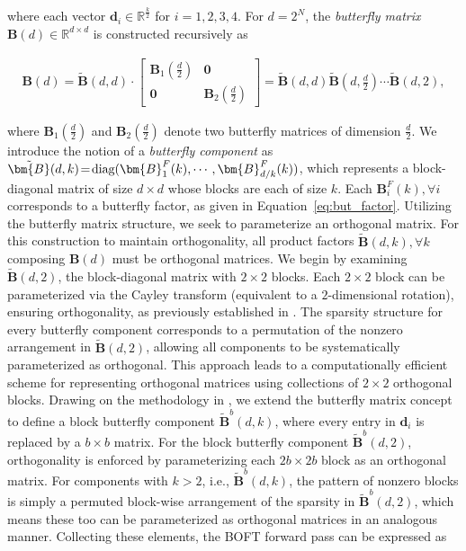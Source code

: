 where each vector $\bm{d}_i \in \mathbb{R}^{\frac{k}{2}}$ for $i=1,2,3,4$. For $d=2^N$, the \emph{butterfly matrix} $\bm{B}(d)\in\mathbb{R}^{d\times d}$ is constructed recursively as

\begin{equation}
\begin{aligned}
    \!\!\bm{B}(d)=\tilde{\bm{B}}(d,d)\!\cdot\!\begin{bmatrix}
    \bm{B}_1(\frac{d}{2})\!\!\!\!\! & \bm{0} \\
    \bm{0}\!\!\!\!\! &\bm{B}_2(\frac{d}{2})
    \end{bmatrix}= \tilde{\bm{B}}(d,d)\tilde{\bm{B}}(d,\frac{d}{2})\cdots\tilde{\bm{B}}(d,2),
\end{aligned}
\end{equation}

where $\bm{B}_1(\frac{d}{2})$ and $\bm{B}_2(\frac{d}{2})$ denote two butterfly matrices of dimension $\frac{d}{2}$. We introduce the notion of a \emph{butterfly component} as $\thickmuskip=2mu \medmuskip=2mu \tilde{\bm{B}}(d,k)=\text{diag}(\bm{B}^F_1(k),\cdots,\bm{B}^F_{d/k}(k))$, which represents a block-diagonal matrix of size $d\times d$ whose blocks are each of size $k$. Each $\bm{B}^F_i(k),\forall i$ corresponds to a butterfly factor, as given in Equation~\ref{eq:but_factor}. Utilizing the butterfly matrix structure, we seek to parameterize an orthogonal matrix. For this construction to maintain orthogonality, all product factors $\tilde{\bm{B}}(d,k),\forall k$ composing $\bm{B}(d)$ must be orthogonal matrices. We begin by examining $\tilde{\bm{B}}(d,2)$, the block-diagonal matrix with $2\times2$ blocks. Each $2\times2$ block can be parameterized via the Cayley transform (equivalent to a $2$-dimensional rotation), ensuring orthogonality, as previously established in \cite{liu2021orthogonal,qiu2023controlling}. The sparsity structure for every butterfly component corresponds to a permutation of the nonzero arrangement in $\tilde{\bm{B}}(d,2)$, allowing all components to be systematically parameterized as orthogonal. This approach leads to a computationally efficient scheme for representing orthogonal matrices using collections of $2\times2$ orthogonal blocks. Drawing on the methodology in \cite{chen2022pixelated}, we extend the butterfly matrix concept to define a block butterfly component $\tilde{\bm{B}}^b(d,k)$, where every entry in $\bm{d}_i$ is replaced by a $b\times b$ matrix. For the block butterfly component $\tilde{\bm{B}}^b(d,2)$, orthogonality is enforced by parameterizing each $2b\times 2b$ block as an orthogonal matrix. For components with $k>2$, i.e., $\tilde{\bm{B}}^b(d,k)$, the pattern of nonzero blocks is simply a permuted block-wise arrangement of the sparsity in $\tilde{\bm{B}}^b(d,2)$, which means these too can be parameterized as orthogonal matrices in an analogous manner. Collecting these elements, the BOFT forward pass can be expressed as

